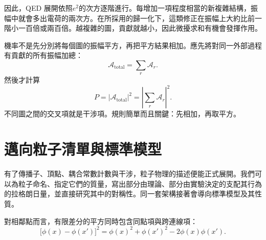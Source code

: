 因此，QED 展開依照\(e^2\)的次方逐階進行。每增加一項程度相當的新複雜結構，振幅中就會多出電荷的兩次方。在所採用的歸一化下，這類修正在振幅上大約比前一階小一百倍或兩百倍。越複雜的圖，貢獻就越小，因此微擾求和有機會發揮作用。

機率不是先分別將每個圖的振幅平方，再把平方結果相加。應先將對同一外部過程有貢獻的所有振幅加總：
\begin{equation}
\mathcal{A}_{\mathrm{total}}=\sum_r\mathcal{A}_r.
\end{equation}
然後才計算
\begin{equation}
P=\left|\mathcal{A}_{\mathrm{total}}\right|^2
=\left|\sum_r\mathcal{A}_r\right|^2.
\end{equation}
不同圖之間的交叉項就是干涉項。規則簡單而且關鍵：先相加，再取平方。

\section{邁向粒子清單與標準模型}

有了傳播子、頂點、耦合常數計數與干涉，粒子物理的描述便能正式展開。我們可以為粒子命名、指定它們的質量，寫出部分由理論、部分由實驗決定的支配其行為的拉格朗日量，並直接研究其中的對稱性。同一套架構接著會導向標準模型及其性質。

\begin{classroomqa}
\end{classroomqa}

\begin{classroomqa}
\end{classroomqa}

對相鄰點而言，有限差分的平方同時包含同點項與跨連線項：
\begin{equation}
\bigl[\phi(x)-\phi(x')\bigr]^2
=
\phi(x)^2+\phi(x')^2-2\phi(x)\phi(x').
\end{equation}

\begin{classroomqa}
\end{classroomqa}
